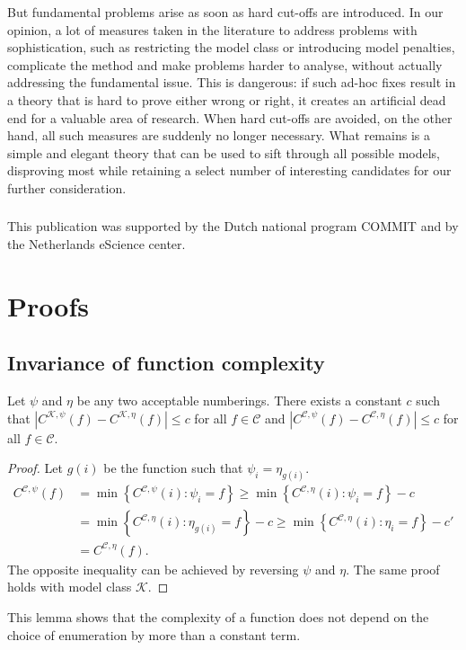 \documentclass{style/llncs}
\newcommand{\C}{\mathscr C}
\newcommand{\K}{\mathscr K}
\begin{document}
But fundamental problems arise as soon as hard cut-offs are introduced. In our opinion, a lot of measures taken in the literature to address problems with sophistication, such as restricting the model class or introducing model penalties, complicate the method and make problems harder to analyse, without actually addressing the fundamental issue. This is dangerous: if such ad-hoc fixes result in a theory that is hard to prove either wrong or right, it creates an artificial dead end for a valuable area of research. When hard cut-offs are avoided, on the other hand, all such measures are suddenly no longer necessary. What remains is a simple and elegant theory that can be used to sift through all possible models, disproving most while retaining a select number of interesting candidates for our further consideration.

\subsubsection*{\ackname}

This publication was supported by the Dutch national program COMMIT and by  the Netherlands eScience center.




\appendix

\section{Proofs}

\subsection{Invariance of function complexity}

\begin{lemma}
Let $\psi$ and $\eta$ be any two acceptable numberings. There exists a constant $c$ such that $\left| C^{\K,\psi}(f) - C^{\K, \eta}(f)\right | \leq c$ for all $f \in \C$ and $\left| C^{\C,\psi}(f) - C^{\C, \eta}(f)\right | \leq c$ for all $f \in \C$. \label{lemma:invariance}
\end{lemma}
\begin{proof}
Let $g(i)$ be the function such that $\psi_i=\eta_{g(i)}$.
\begin{align*}
C^{\C,\psi}(f) &= \min\left\{ C^{\C,\psi}(i) : \psi_i= f\right\} 
\geq \min\left\{ C^{\C, \eta}(i) : \psi_i= f\right\} - c\\
&= \min\left\{ C^{\C, \eta}(i) : \eta_{g(i)}= f\right\} - c
\geq \min\left\{ C^{\C, \eta}(i) : \eta_i= f\right\} - c' \\
&= C^{\C, \eta}(f).
\end{align*}
The opposite inequality can be achieved by reversing $\psi$ and $\eta$. The same proof holds with model class $\K$.
\end{proof}
This lemma shows that the complexity of a function does not depend on the choice of
enumeration by more than a constant term.
\end{document}

